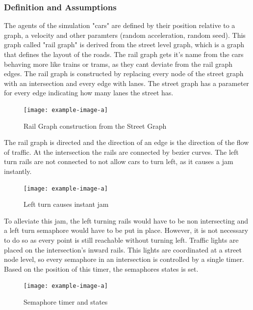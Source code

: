 \documentclass{article}
\begin{document}
\subsubsection{Definition and Assumptions}
The agents of the simulation "cars" are defined by their position relative to a graph, a velocity and other paramters (random acceleration, random seed). This graph called "rail graph" is derived from the street level graph, which is a graph that defines the layout of the roads. The rail graph gets it's name from the cars behaving more like trains or trams, as they cant deviate from the rail graph edges. The rail graph is constructed by replacing every node of the street graph with an intersection and every edge with lanes. The street graph has a parameter for every edge indicating how many lanes the street has.
\begin{figure}[H]
\texttt{[image: example-image-a]}
\caption{Rail Graph construction from the Street Graph}
\end{figure}
\bigskip 
 The rail graph is directed and the direction of an edge is the direction of the flow of traffic. At the intersection the rails are connected by bezier curves. The left turn rails are not connected to not allow cars to turn left, as it causes a jam instantly.
\begin{figure}[H]
\texttt{[image: example-image-a]}
\caption{Left turn causes instant jam}
\end{figure}
\bigskip 
 To alleviate this jam, the left turning rails would have to be non intersecting and a left turn semaphore would have to be put in place. However, it is not necessary to do so as every point is still reachable without turning left.
Traffic lights are placed on the intersection's inward rails. This lights are coordinated at a street node level, so every semaphore in an intersection is controlled by a single timer. Based on the position of this timer, the semaphores states is set.
\begin{figure}[H]
\texttt{[image: example-image-a]}
\caption{Semaphore timer and states}
\end{figure}
\end{document}
